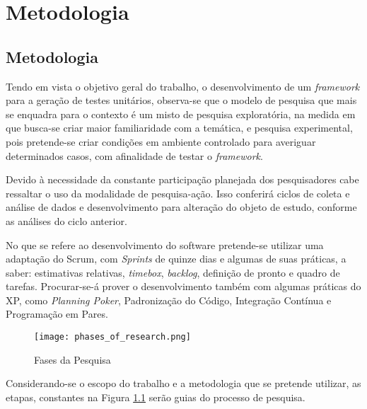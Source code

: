\chapter[Metodologia]{Metodologia}







  \section{Metodologia}
  Tendo em vista o objetivo geral do trabalho, o desenvolvimento de um \textit{framework} para a geração de testes unitários, observa-se que o modelo de pesquisa que mais se enquadra para o contexto é um misto de pesquisa exploratória, na medida em que busca-se criar maior familiaridade com a temática, e pesquisa experimental, pois pretende-se criar condições em ambiente controlado para averiguar determinados casos, com afinalidade de testar o \textit{framework}.
  \par
  \indent Devido à necessidade da constante participação planejada dos pesquisadores cabe ressaltar o uso da modalidade de pesquisa-ação. Isso conferirá ciclos de coleta e análise de dados e desenvolvimento para alteração do objeto de estudo, conforme as análises do ciclo anterior.
  \par
  \indent No que se refere ao desenvolvimento do software pretende-se utilizar uma adaptação do Scrum, com \textit{Sprints} de quinze dias e algumas de suas práticas, a saber: estimativas relativas, \textit{timebox}, \textit{backlog}, definição de pronto e quadro de tarefas. Procurar-se-á prover o desenvolvimento também com algumas práticas do XP, como \textit{Planning Poker}, Padronização do Código, Integração Contínua e Programação em Pares.
  \newpage
  \begin{figure}[h]
    \centering
    \texttt{[image: phases\_of\_research.png]}
    \caption{Fases da Pesquisa}
    \label{fig:phases_of_research}
  \end{figure}
  \indent Considerando-se o escopo do trabalho e a metodologia que se pretende utilizar, as etapas, constantes na Figura \ref{fig:phases_of_research} serão guias do processo de pesquisa.
